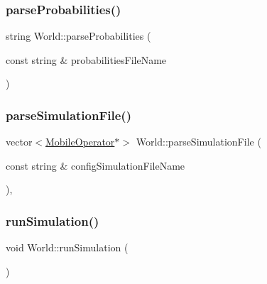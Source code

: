 \mbox{\label{class_world_a5675c3a896891827dd59255a9761f08e}} 
\subsubsection{\texorpdfstring{parseProbabilities()}{parseProbabilities()}}
{\footnotesize\ttfamily string World\+::parse\+Probabilities (\begin{DoxyParamCaption}\item[{const string \&}]{probabilities\+File\+Name }\end{DoxyParamCaption})\hspace{0.3cm}{\ttfamily [private]}}

\mbox{\label{class_world_adef43cc4ccb918aa68c00ee1e3286321}} 
\subsubsection{\texorpdfstring{parseSimulationFile()}{parseSimulationFile()}}
{\footnotesize\ttfamily vector$<$\mbox{\hyperlink{class_mobile_operator}{Mobile\+Operator}}$\ast$$>$ World\+::parse\+Simulation\+File (\begin{DoxyParamCaption}\item[{const string \&}]{config\+Simulation\+File\+Name }\end{DoxyParamCaption})\hspace{0.3cm}{\ttfamily [private]}, {\ttfamily [noexcept]}}

\mbox{\label{class_world_aa825a43f968c8fe750c67156e64721ff}} 
\subsubsection{\texorpdfstring{runSimulation()}{runSimulation()}}
{\footnotesize\ttfamily void World\+::run\+Simulation (\begin{DoxyParamCaption}{ }\end{DoxyParamCaption})\hspace{0.3cm}{\ttfamily [noexcept]}}

